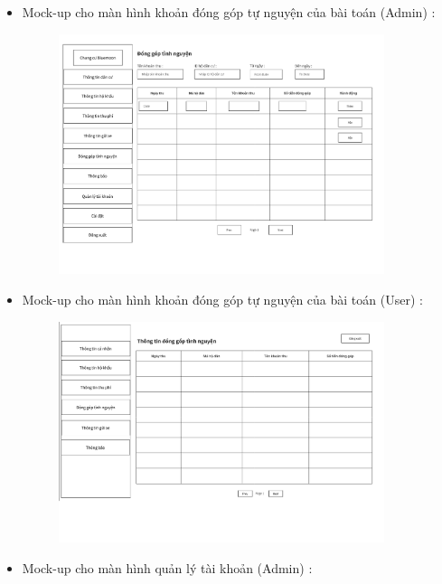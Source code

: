 \documentclass{article}
\begin{document}
\begin{itemize}
\begin{figure}[H]
    \end{figure}
    \newpage
    \item Mock-up cho màn hình khoản đóng góp tự nguyện của bài toán (Admin) :
    \begin{figure}[H]
        \centering
        \includegraphics[width=0.9\textwidth]{Ảnh chương 4/Màn hình đóng góp tình nguyện.png}
    \end{figure}
    \vspace{1cm}
    \item Mock-up cho màn hình khoản đóng góp tự nguyện của bài toán (User) :
    \begin{figure}[H]
        \centering
        \includegraphics[width=0.9\textwidth]{Ảnh chương 4/Màn hình đóng góp (cư dân).png}
    \end{figure}
    \newpage
    \item Mock-up cho màn hình quản lý tài khoản (Admin) :
    \begin{figure}[H]

\end{figure}
\end{itemize}
\end{document}
